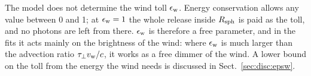 The model does not determine the wind toll $\epsilon_{\rm w}$.
Energy conservation allows any value between 0 and 1; at $\epsilon_{\rm w} = 1$ the whole release inside $R_{\rm sph}$ is paid as the toll, and no photons are left from there.
$\epsilon_{\rm w}$ is therefore a free parameter, and in the fits it acts mainly on the brightness of the wind: where $\epsilon_{\rm w}$ is much larger than the advection ratio $\tau_\perp v_{\rm w}/c$, it works as a free dimmer of the wind.
A lower bound on the toll from the energy the wind needs is discussed in Sect.~\ref{sec:disc:epsw}.
